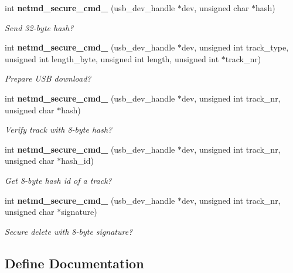 \begin{DoxyCompactItemize}
int {\bf netmd\_\-secure\_\-cmd\_} (usb\_\-dev\_\-handle $\ast$dev, unsigned char $\ast$hash)
\begin{DoxyCompactList}\small\item\em Send 32-\/byte hash? \item\end{DoxyCompactList}\item 
int {\bf netmd\_\-secure\_\-cmd\_} (usb\_\-dev\_\-handle $\ast$dev, unsigned int track\_\-type, unsigned int length\_\-byte, unsigned int length, unsigned int $\ast$track\_\-nr)
\begin{DoxyCompactList}\small\item\em Prepare USB download? \item\end{DoxyCompactList}\item 
int {\bf netmd\_\-secure\_\-cmd\_} (usb\_\-dev\_\-handle $\ast$dev, unsigned int track\_\-nr, unsigned char $\ast$hash)
\begin{DoxyCompactList}\small\item\em Verify track with 8-\/byte hash? \item\end{DoxyCompactList}\item 
int {\bf netmd\_\-secure\_\-cmd\_} (usb\_\-dev\_\-handle $\ast$dev, unsigned int track\_\-nr, unsigned char $\ast$hash\_\-id)
\begin{DoxyCompactList}\small\item\em Get 8-\/byte hash id of a track? \item\end{DoxyCompactList}\item 
int {\bf netmd\_\-secure\_\-cmd\_} (usb\_\-dev\_\-handle $\ast$dev, unsigned int track\_\-nr, unsigned char $\ast$signature)
\begin{DoxyCompactList}\small\item\em Secure delete with 8-\/byte signature? \item\end{DoxyCompactList}\end{DoxyCompactItemize}


\subsection{Define Documentation}
